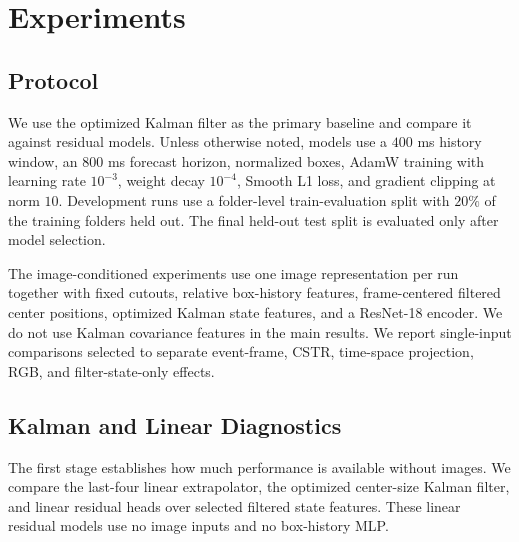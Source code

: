 \section{Experiments}

\subsection{Protocol}

We use the optimized Kalman filter as the primary baseline and compare it against residual models. Unless otherwise noted, models use a $400$ ms history window, an $800$ ms forecast horizon, normalized boxes, AdamW training with learning rate $10^{-3}$, weight decay $10^{-4}$, Smooth L1 loss, and gradient clipping at norm $10$. Development runs use a folder-level train-evaluation split with $20\%$ of the training folders held out. The final held-out test split is evaluated only after model selection.

The image-conditioned experiments use one image representation per run together with fixed cutouts, relative box-history features, frame-centered filtered center positions, optimized Kalman state features, and a ResNet-18 encoder. We do not use Kalman covariance features in the main results. We report single-input comparisons selected to separate event-frame, CSTR, time-space projection, RGB, and filter-state-only effects.

\subsection{Kalman and Linear Diagnostics}

The first stage establishes how much performance is available without images. We compare the last-four linear extrapolator, the optimized center-size Kalman filter, and linear residual heads over selected filtered state features. These linear residual models use no image inputs and no box-history MLP.


